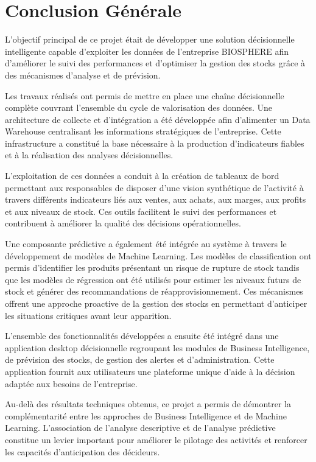 \chapter*{Conclusion Générale}

L'objectif principal de ce projet était de développer une solution décisionnelle intelligente capable d'exploiter les données de l'entreprise BIOSPHERE afin d'améliorer le suivi des performances et d'optimiser la gestion des stocks grâce à des mécanismes d'analyse et de prévision.

Les travaux réalisés ont permis de mettre en place une chaîne décisionnelle complète couvrant l'ensemble du cycle de valorisation des données. Une architecture de collecte et d'intégration a été développée afin d'alimenter un Data Warehouse centralisant les informations stratégiques de l'entreprise. Cette infrastructure a constitué la base nécessaire à la production d'indicateurs fiables et à la réalisation des analyses décisionnelles.

L'exploitation de ces données a conduit à la création de tableaux de bord permettant aux responsables de disposer d'une vision synthétique de l'activité à travers différents indicateurs liés aux ventes, aux achats, aux marges, aux profits et aux niveaux de stock. Ces outils facilitent le suivi des performances et contribuent à améliorer la qualité des décisions opérationnelles.

Une composante prédictive a également été intégrée au système à travers le développement de modèles de Machine Learning. Les modèles de classification ont permis d'identifier les produits présentant un risque de rupture de stock tandis que les modèles de régression ont été utilisés pour estimer les niveaux futurs de stock et générer des recommandations de réapprovisionnement. Ces mécanismes offrent une approche proactive de la gestion des stocks en permettant d'anticiper les situations critiques avant leur apparition.

L'ensemble des fonctionnalités développées a ensuite été intégré dans une application desktop décisionnelle regroupant les modules de Business Intelligence, de prévision des stocks, de gestion des alertes et d'administration. Cette application fournit aux utilisateurs une plateforme unique d'aide à la décision adaptée aux besoins de l'entreprise.

Au-delà des résultats techniques obtenus, ce projet a permis de démontrer la complémentarité entre les approches de Business Intelligence et de Machine Learning. L'association de l'analyse descriptive et de l'analyse prédictive constitue un levier important pour améliorer le pilotage des activités et renforcer les capacités d'anticipation des décideurs.


